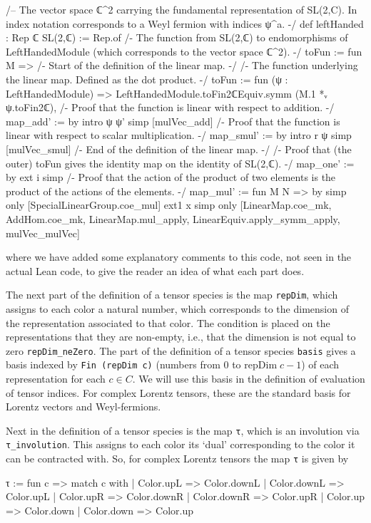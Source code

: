 \documentclass[a4paper, 11pt]{article}
\begin{document}
\begin{codeLong}
/-- The vector space ℂ^2 carrying the fundamental representation of SL(2,C).
  In index notation corresponds to a Weyl fermion with indices ψ^a. -/
def leftHanded : Rep ℂ SL(2,ℂ) := Rep.of {
  /- The function from SL(2,ℂ) to endomorphisms of LeftHandedModule 
    (which corresponds to the vector space ℂ^2). -/
  toFun := fun M => {
    /- Start of the definition of the linear map. -/
    /- The function underlying the linear map. Defined as the dot product. -/
    toFun := fun (ψ : LeftHandedModule) =>
      LeftHandedModule.toFin2ℂEquiv.symm (M.1 *ᵥ ψ.toFin2ℂ),
    /- Proof that the function is linear with respect to addition. -/
    map_add' := by
      intro ψ ψ'
      simp [mulVec_add]
    /- Proof that the function is linear with respect to scalar multiplication. -/
    map_smul' := by
      intro r ψ
      simp [mulVec_smul]
    /- End of the definition of the linear map. -/}
  /- Proof that (the outer) toFun gives the identity map on the identity of SL(2,ℂ). -/
  map_one' := by
    ext i
    simp
  /- Proof that the action of the product of two elements is 
    the product of the actions of the elements. -/
  map_mul' := fun M N => by
    simp only [SpecialLinearGroup.coe_mul]
    ext1 x
    simp only [LinearMap.coe_mk, AddHom.coe_mk, LinearMap.mul_apply, LinearEquiv.apply_symm_apply,
      mulVec_mulVec]}
\end{codeLong} 
where we have added some explanatory comments to this code, not seen in the actual Lean code, to give 
the reader an idea of what each part does. 

The next part of the definition of a tensor species is the map \lstinline|repDim|, which assigns to each color a natural number,
which corresponds to the dimension of the representation associated to that color. The condition is placed on the representations that they are non-empty, i.e., 
that the dimension is not equal to zero \lstinline|repDim_neZero|.  
The part of the definition of a tensor species \lstinline|basis| gives a basis indexed by \lstinline|Fin (repDim c)| (numbers from 0 to $\mathrm{repDim}\; c -1 $)  of each representation for each $c \in C$.  
We will use this basis in the definition of evaluation of tensor indices. For complex Lorentz tensors, 
these are the standard basis for Lorentz vectors and Weyl-fermions. 

Next in the definition of a  tensor species is the map 
\lstinline|τ|, which is an involution via \lstinline|τ_involution|.
This assigns to each color its `dual' corresponding to the color it can be contracted with. So, for complex Lorentz tensors 
the map \lstinline|τ| is given by 
\begin{code} 
τ := fun c =>
  match c with
  | Color.upL => Color.downL
  | Color.downL => Color.upL
  | Color.upR => Color.downR
  | Color.downR => Color.upR
  | Color.up => Color.down
  | Color.down => Color.up
\end{code}
\end{document}
